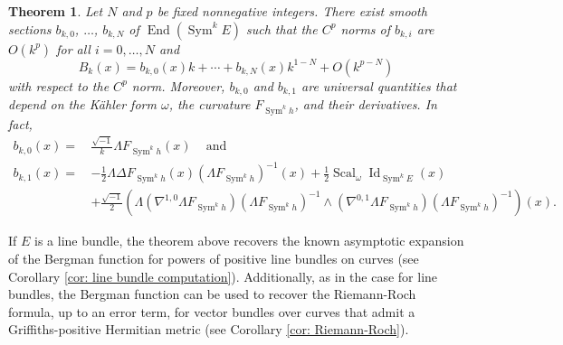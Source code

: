 \documentclass{amsart}
\newtheorem{thm}{Theorem}[section]
\theoremstyle{definition}
\theoremstyle{remark}
\numberwithin{equation}{section}
\DeclareMathOperator{\Sym}{Sym}
\DeclareMathOperator{\Id}{Id}
\DeclareMathOperator{\End}{End}
\DeclareMathOperator{\Scal}{Scal}
\begin{document}
\begin{thm} \label{thm: Main}
Let $N$ and $p$ be fixed nonnegative integers. There exist smooth sections $b_{k,0}$, $\dotsc$, $b_{k,N}$ of $\End(\Sym^k E)$ such that the $C^p$ norms of $b_{k,i}$ are $O(k^p)$ for all $i = 0, \dotsc, N$ and
$$
B_k(x) = b_{k,0}(x) k + \dotsb + b_{k,N}(x) k^{1-N} + O(k^{p-N})
$$
with respect to the $C^p$ norm. Moreover, $b_{k,0}$ and $b_{k,1}$ are universal quantities that depend on the K\"ahler form $\omega$, the curvature $F_{\Sym^k h}$, and their derivatives. In fact,
\begin{align*}
b_{k,0}(x) = \hspace{2pt} & \frac{\sqrt{-1}}{k} \Lambda F_{\Sym^k h}(x) \hspace{10pt} \text{ and } \\
    b_{k,1}(x) = \hspace{2pt} & -\frac{1}{2} \Lambda \Delta F_{\Sym^k h}(x) (\Lambda F_{\Sym^k h})^{-1}(x) + \frac{1}{2} \Scal_\omega \Id_{\Sym^k E} (x)\\
    & + \frac{\sqrt{-1}}{2} \left ( \Lambda (\nabla^{1,0} \Lambda F_{\Sym^k h}) (\Lambda F_{\Sym^k h})^{-1}  \wedge (\nabla^{0,1} \Lambda F_{\Sym^k h}) (\Lambda F_{\Sym^k h})^{-1} 
 \right) (x).
\end{align*}
\end{thm}





If $E$ is a line bundle, the theorem above recovers the known asymptotic expansion of the Bergman function for powers of positive line bundles on curves (see Corollary \ref{cor: line bundle computation}). Additionally, as in the case for line bundles, the Bergman function can be used to recover the Riemann-Roch formula, up to an error term, for vector bundles over curves that admit a Griffiths-positive Hermitian metric (see Corollary \ref{cor: Riemann-Roch}).
\end{document}

